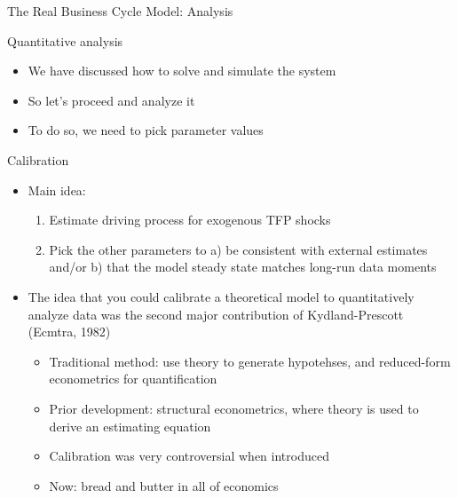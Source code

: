 \documentclass[9pt,xcolor={dvipsnames}]{beamer}
\newcommand{\bit}{\begin{itemize}}
\newcommand{\eit}{\end{itemize}}
\newcommand{\ben}{\begin{enumerate}}
\newcommand{\een}{\end{enumerate}}
\begin{document}
\begin{frame}

\begin{center}
	\huge The Real Business Cycle Model: Analysis \normalfont
\end{center}

\end{frame}



\begin{frame}{Quantitative analysis}

\bit
\setlength\itemsep{1.5em}

\item We have discussed how to solve and simulate the system

\item So let's proceed and analyze it

\item To do so, we need to pick parameter values
\eit

\end{frame}


\begin{frame}{Calibration}

\bit
\setlength\itemsep{2em}

\item Main idea: 
\ben
\setlength\itemsep{0.5em}
	\item Estimate driving process for exogenous TFP shocks
	
	\item Pick the other parameters to a) be consistent with external estimates and/or b) that the model steady state matches long-run data moments
\een

\item The idea that you could calibrate a theoretical model to quantitatively analyze data was the second major contribution of Kydland-Prescott (Ecmtra, 1982)
\bit
\setlength\itemsep{0.5em}
	\item Traditional method: use theory to generate hypotehses, and reduced-form econometrics for quantification
	
	\item Prior development: structural econometrics, where theory is used to derive an estimating equation

	\item Calibration was very controversial when introduced
	
	\item Now: bread and butter in all of economics
\eit
\eit

\end{frame}
\end{document}
